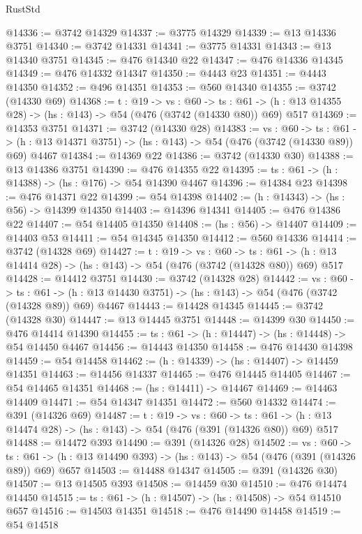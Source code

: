 \begin{lexlean}{RustStd}
\begin{coremodule}
@14336 := @3742 @14329
@14337 := @3775 @14329
@14339 := @13 @14336 @3751
@14340 := @3742 @14331
@14341 := @3775 @14331
@14343 := @13 @14340 @3751
@14345 := @476 @14340 @22
@14347 := @476 @14336 @14345
@14349 := @476 @14332 @14347
@14350 := @4443 @23
@14351 := @4443 @14350
@14352 := @496 @14351
@14353 := @560 @14340
@14355 := @3742 (@14330 @69)
@14368 := {t : @19} ->
  {vs : @60} ->
  {ts : @61} -> (h : @13 @14355 @28) -> (hs : @143) -> @54 (@476 (@3742 (@14330 @80)) @69) @517
@14369 := @14353 @3751
@14371 := @3742 (@14330 @28)
@14383 := {vs : @60} ->
  {ts : @61} -> (h : @13 @14371 @3751) -> (hs : @143) -> @54 (@476 (@3742 (@14330 @89)) @69) @4467
@14384 := @14369 @22
@14386 := @3742 (@14330 @30)
@14388 := @13 @14386 @3751
@14390 := @476 @14355 @22
@14395 := {ts : @61} -> (h : @14388) -> (hs : @176) -> @54 @14390 @4467
@14396 := @14384 @23
@14398 := @476 @14371 @22
@14399 := @54 @14398
@14402 := (h : @14343) -> (hs : @56) -> @14399 @14350
@14403 := @14396 @14341
@14405 := @476 @14386 @22
@14407 := @54 @14405 @14350
@14408 := (hs : @56) -> @14407
@14409 := @14403 @53
@14411 := @54 @14345 @14350
@14412 := @560 @14336
@14414 := @3742 (@14328 @69)
@14427 := {t : @19} ->
  {vs : @60} ->
  {ts : @61} -> (h : @13 @14414 @28) -> (hs : @143) -> @54 (@476 (@3742 (@14328 @80)) @69) @517
@14428 := @14412 @3751
@14430 := @3742 (@14328 @28)
@14442 := {vs : @60} ->
  {ts : @61} -> (h : @13 @14430 @3751) -> (hs : @143) -> @54 (@476 (@3742 (@14328 @89)) @69) @4467
@14443 := @14428 @14345
@14445 := @3742 (@14328 @30)
@14447 := @13 @14445 @3751
@14448 := @14399 @30
@14450 := @476 @14414 @14390
@14455 := {ts : @61} -> (h : @14447) -> (hs : @14448) -> @54 @14450 @4467
@14456 := @14443 @14350
@14458 := @476 @14430 @14398
@14459 := @54 @14458
@14462 := (h : @14339) -> (hs : @14407) -> @14459 @14351
@14463 := @14456 @14337
@14465 := @476 @14445 @14405
@14467 := @54 @14465 @14351
@14468 := (hs : @14411) -> @14467
@14469 := @14463 @14409
@14471 := @54 @14347 @14351
@14472 := @560 @14332
@14474 := @391 (@14326 @69)
@14487 := {t : @19} ->
  {vs : @60} ->
  {ts : @61} -> (h : @13 @14474 @28) -> (hs : @143) -> @54 (@476 (@391 (@14326 @80)) @69) @517
@14488 := @14472 @393
@14490 := @391 (@14326 @28)
@14502 := {vs : @60} ->
  {ts : @61} -> (h : @13 @14490 @393) -> (hs : @143) -> @54 (@476 (@391 (@14326 @89)) @69) @657
@14503 := @14488 @14347
@14505 := @391 (@14326 @30)
@14507 := @13 @14505 @393
@14508 := @14459 @30
@14510 := @476 @14474 @14450
@14515 := {ts : @61} -> (h : @14507) -> (hs : @14508) -> @54 @14510 @657
@14516 := @14503 @14351
@14518 := @476 @14490 @14458
@14519 := @54 @14518

\end{coremodule}
\end{lexlean}
